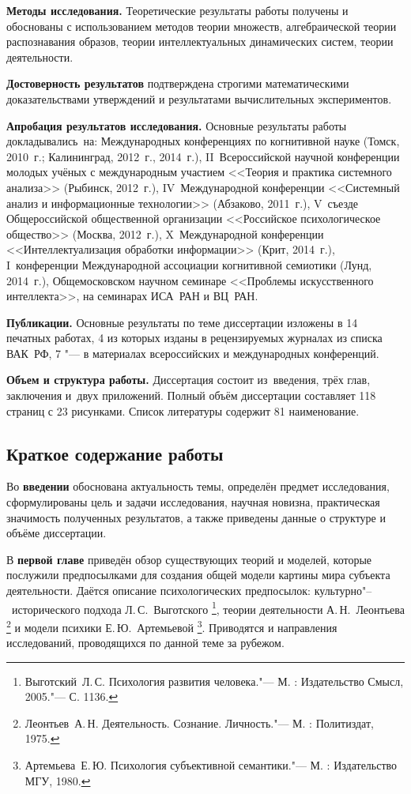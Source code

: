 \textbf{Методы исследования.} Теоретические результаты работы получены и обоснованы с использованием методов теории множеств, алгебраической теории распознавания образов, теории интеллектуальных динамических систем, теории деятельности.

\textbf{Достоверность результатов} подтверждена строгими математическими доказательствами утверждений и результатами вычислительных экспериментов.

\textbf{Апробация результатов исследования.} Основные результаты работы докладывались~на: Международных конференциях по когнитивной науке (Томск, 2010~г.; Калининград, 2012~г., 2014~г.), II~Всероссийской научной конференции молодых учёных с международным участием <<Теория и практика системного анализа>> (Рыбинск, 2012~г.), IV~Международной конференции <<Системный анализ и информационные технологии>> (Абзаково, 2011~г.), V~съезде Общероссийской общественной организации <<Российское психологическое общество>> (Москва, 2012~г.), X~Международной конференции <<Интеллектуализация обработки информации>> (Крит, 2014~г.), I~конференции Международной ассоциации когнитивной семиотики (Лунд, 2014~г.), Общемосковском научном семинаре <<Проблемы искусственного интеллекта>>, на семинарах ИСА~РАН и ВЦ~РАН.

\textbf{Публикации.} Основные результаты по теме диссертации изложены в 14 печатных работах, 4 из которых изданы в рецензируемых журналах из списка ВАК~РФ, 7 "--- в материалах всероссийских и международных конференций.

\textbf{Объем и структура работы.} Диссертация состоит из~введения, трёх глав, заключения и~двух приложений. Полный объём диссертации составляет 118 страниц с 23 рисунками. Список литературы содержит 81 наименование.

\newpage
\subsection*{\Large Краткое содержание работы}
Во \textbf{введении} обоснована актуальность темы, определён предмет исследования, сформулированы цель и задачи исследования, научная новизна, практическая значимость полученных результатов, а также приведены данные о структуре и объёме диссертации.

В \textbf{первой главе} приведён обзор существующих теорий и моделей, которые послужили предпосылками для создания общей модели картины мира субъекта деятельности. Даётся описание психологических предпосылок: культурно"--~исторического подхода Л.\,С.~Выготского \footnote{Выготский~Л.\,С. Психология развития человека."--- М. : Издательство Смысл, 2005."---	С. 1136.}, теории деятельности А.\,Н.~Леонтьева \footnote{Леонтьев~А.\,Н. Деятельность. Сознание. Личность."--- М. : Политиздат, 1975.} и модели психики Е.\,Ю.~Артемьевой \footnote{Артемьева~Е.\,Ю. Психология субъективной семантики."--- М. : Издательство МГУ, 1980.}. Приводятся и направления исследований, проводящихся по данной теме за рубежом.

